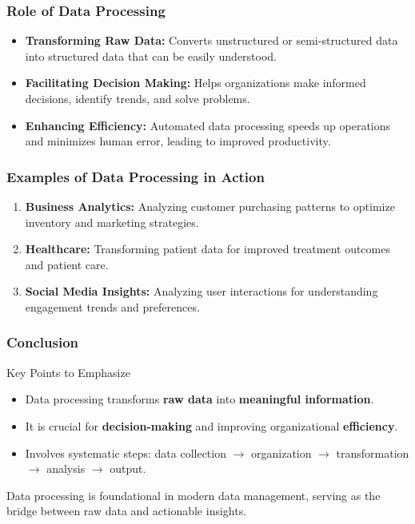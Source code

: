 \documentclass[aspectratio=169]{beamer}
\begin{document}
\begin{frame}[fragile]
    \frametitle{Role of Data Processing}
    \begin{itemize}
        \item \textbf{Transforming Raw Data:} Converts unstructured or semi-structured data into structured data that can be easily understood.
        \item \textbf{Facilitating Decision Making:} Helps organizations make informed decisions, identify trends, and solve problems.
        \item \textbf{Enhancing Efficiency:} Automated data processing speeds up operations and minimizes human error, leading to improved productivity.
    \end{itemize}
\end{frame}

\begin{frame}[fragile]
    \frametitle{Examples of Data Processing in Action}
    \begin{enumerate}
        \item \textbf{Business Analytics:} Analyzing customer purchasing patterns to optimize inventory and marketing strategies.
        \item \textbf{Healthcare:} Transforming patient data for improved treatment outcomes and patient care.
        \item \textbf{Social Media Insights:} Analyzing user interactions for understanding engagement trends and preferences.
    \end{enumerate}
\end{frame}

\begin{frame}[fragile]
    \frametitle{Conclusion}
    \begin{block}{Key Points to Emphasize}
        \begin{itemize}
            \item Data processing transforms \textbf{raw data} into \textbf{meaningful information}.
            \item It is crucial for \textbf{decision-making} and improving organizational \textbf{efficiency}.
            \item Involves systematic steps: data collection $\rightarrow$ organization $\rightarrow$ transformation $\rightarrow$ analysis $\rightarrow$ output.
        \end{itemize}
    \end{block}
    
    Data processing is foundational in modern data management, serving as the bridge between raw data and actionable insights.
\end{frame}
\end{document}
